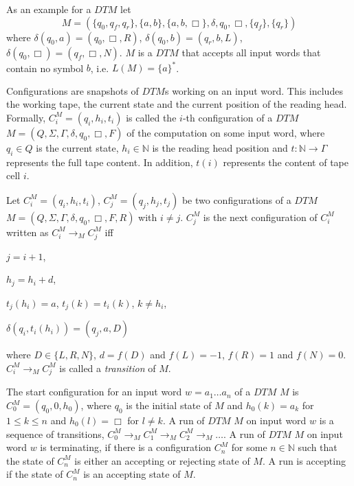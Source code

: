 \begin{example}
    \label{example:dtm}
    As an example for a $\mathit{DTM}$ let
    \[M = (\{q_0, q_f, q_r\}, \{a, b\}, \{a, b, \Box\}, \delta, q_0, \Box, \{q_f\}, \{q_r\})\]
    where $\delta(q_0, a)= (q_0, \Box, R)$, $\delta(q_0, b) = (q_r, b, L)$, $\delta(q_0, \Box) = (q_f, \Box, N)$.
    $M$ is a $\mathit{DTM}$ that accepts all input words that contain no symbol $b$, i.e. $L(M) = \{a\}^*$.
\end{example}

Configurations are snapshots of $\mathit{DTM}$s working on an input word. This includes the working tape, the current
state and the current position of the reading head. Formally, $C_i^M = (q_i, h_i, t_i)$ is called the $i$-th
configuration of a $\mathit{DTM}$ $M = (Q, \Sigma, \Gamma, \delta, q_0, \Box, F)$ of the computation on some input
word, where $q_i \in Q$ is the current state, $h_i \in \mathbb{N}$ is the reading head position and $t: \mathbb{N}
\rightarrow \Gamma$ represents the full tape content. In addition, $t(i)$ represents the content of tape cell $i$.

\begin{definition}
    Let $C_i^M = (q_i, h_i, t_i)$, $C_j^M = (q_j, h_j, t_j)$ be two configurations of a
    $\mathit{DTM}$ $M = (Q, \Sigma, \Gamma, \delta, q_0, \Box, F, R)$ with $i \neq j$. $C_j^M$ is the next configuration
    of $C_i^M$ written as $C_i^M \rightarrow_M C_j^M$ iff
    \begin{compactitem}
        \item $j = i + 1$,

        \item $h_j = h_i + d$,

        \item $t_j(h_i) = a$, $t_j(k) = t_i(k)$, $k \neq h_i$,

        \item $\delta(q_i, t_i(h_i)) = (q_j, a, D)$
    \end{compactitem}
    where $D \in \{L, R, N\}$, $d = f(D)$ and $f(L) = -1$, $f(R) = 1$ and $f(N) = 0$. $C_i^M \rightarrow_M C_j^M$ is
    called a \emph{transition} of $M$.
\end{definition}

The start configuration for an input word $w = a_1\dots a_n$ of a $\mathit{DTM}$ $M$ is $C_0^M = (q_0, 0, h_{0})$,
where $q_0$ is the initial state of $M$ and $h_0(k) = a_k$ for $1 \leq k \leq n$ and $h_0(l) = \Box$ for $l \neq k$. A
run of $\mathit{DTM}$ $M$ on input word $w$ is a sequence of transitions, $C_0^M \rightarrow_M C_1^M \rightarrow_M
C_2^M \rightarrow_M \dots$. A run of $\mathit{DTM}$ $M$ on input word $w$ is terminating, if there is a
configuration $C_n^M$ for some $n \in \mathbb{N}$ such that the state of $C_n^M$ is either an accepting or rejecting
state of $M$. A run is accepting if the state of $C_n^M$ is an accepting state of $M$.

